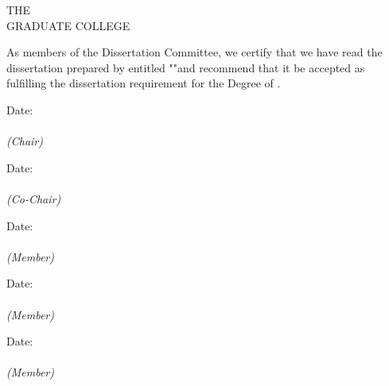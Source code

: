 \begin{singlespacing} %
\begin{center}

THE \MakeUppercase{\univname} \\
GRADUATE COLLEGE
\end{center}

\vspace*{0.3in}

\noindent As members of the Dissertation Committee, we certify that we have read the dissertation prepared by \authorname \space entitled "\ttitle "\space and recommend that it be accepted as fulfilling the dissertation requirement for the Degree of \degreename.

\vspace*{0.3in}

\noindent\underline{\makebox[4.0in][r]{}} \hspace{0.4in} Date:  \\
{\bfseries\chairname}\\
\emph{(Chair)} %
\vspace*{0.3in}

\noindent\underline{\makebox[4.0in][r]{}} \hspace{0.4in} Date:  \\
{\bfseries\facnameA}\\
\emph{(Co-Chair)} %
\vspace*{0.3in}

\noindent\underline{\makebox[4.0in][r]{}} \hspace{0.4in} Date:  \\
{\bfseries\facnameB}\\
\emph{(Member)} %
\vspace*{0.3in}

\noindent\underline{\makebox[4.0in][r]{}} \hspace{0.4in} Date:  \\
{\bfseries\facnameC}\\
\emph{(Member)} %
\vspace*{0.3in}

\noindent\underline{\makebox[4.0in][r]{}} \hspace{0.4in} Date:  \\
{\bfseries\facnameD}\\
\emph{(Member)} %


\end{singlespacing}
